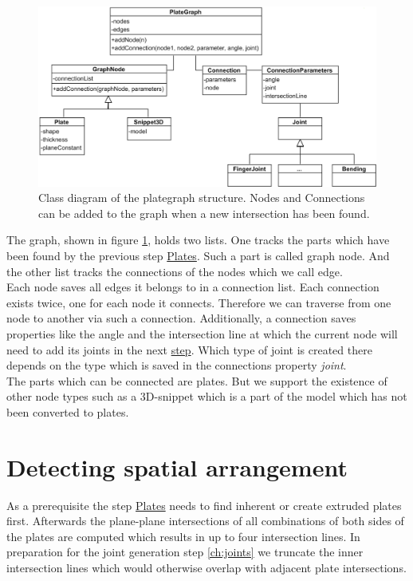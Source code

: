 \documentclass[../ClassicThesis.tex]{subfiles}
\begin{document}
\begin{figure}[!ht]
\centering
\includegraphics[width=1\columnwidth]{Images/GraphStructure.png}
\caption{Class diagram of the plategraph structure. Nodes and Connections can be added to the graph when a new intersection has been found.}
\label{fig:graphClassDiagram}
\end{figure}
The graph, shown in figure \ref{fig:graphClassDiagram}, holds two lists. One tracks the parts which have been found by the previous step \hyperref[ch:plates]{Plates}. Such a part is called graph node. And the other list tracks the connections of the nodes which we call edge. \\
Each node saves all edges it belongs to in a connection list. Each connection exists twice, one for each node it connects. Therefore we can traverse from one node to another via such a connection. Additionally, a connection saves properties like the angle and the intersection line at which the current node will need to add its joints in the next \hyperref[ch:joints]{step}. Which type of joint is created there depends on the type which is saved in the connections property \emph{joint}.\\
The parts which can be connected are plates. But we support the existence of other node types such as a 3D-snippet which is a part of the model which has not been converted to plates.

\section{Detecting spatial arrangement}
As a prerequisite the step \hyperref[ch:plates]{Plates} needs to find inherent or create extruded plates first. Afterwards the plane-plane intersections of all combinations of both sides of the plates are computed which results in up to four intersection lines. In preparation for the joint generation step \ref{ch:joints} we truncate the inner intersection lines which would otherwise overlap with adjacent plate intersections.
\end{document}
